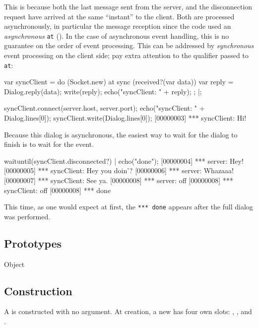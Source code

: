 This is because both the last message sent from the server, and the
disconnection request have arrived at the same ``instant'' to the client.
Both are processed asynchronously, in particular the message reception since
the code used an \emph{asynchronous} \lstinline{at}
(\label{sec:lang:at:sync-async}).  In the case of asynchronous event
handling, this is no guarantee on the order of event processing.  This can
be addressed by \emph{synchronous} event processing on the client side; pay
extra attention to the  qualifier passed to \lstinline{at}:

\begin{urbiscript}
var syncClient =
  do (Socket.new)
  {
    at sync (received?(var data))
    {
      var reply = Dialog.reply(data);
      write(reply);
      echo("syncClient: " + reply);
    };
  }|;

syncClient.connect(server.host, server.port);
echo("syncClient: " + Dialog.lines[0]);
syncClient.write(Dialog.lines[0]);
[00000003] *** syncClient: Hi!
\end{urbiscript}

Because this dialog is asynchronous, the easiest way to wait for the dialog
to finish is to wait for the  event.

\begin{urbiscript}
waituntil(syncClient.disconnected?) | echo("done");
[00000004] *** server: Hey!
[00000005] *** syncClient: Hey you doin'?
[00000006] *** server: Whazaaa!
[00000007] *** syncClient: See ya.
[00000008] *** server: off
[00000008] *** syncClient: off
[00000008] *** done
\end{urbiscript}

\noindent
This time, as one would expect at first, the \lstinline{*** done} appears
after the full dialog was performed.


\subsection{Prototypes}
\begin{refObjects}
\item[Object]
\end{refObjects}

\subsection{Construction}

A  is constructed with no argument. At creation, a
new  has four own slots: ,
,  and .


